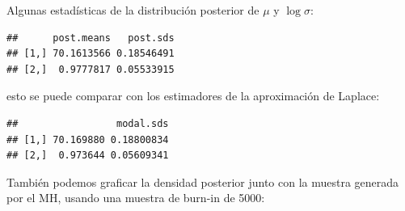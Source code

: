 \documentclass[
  12pt,
]{book}
\newenvironment{Shaded}{\begin{snugshade}}{\end{snugshade}}
\newcommand{\AttributeTok}[1]{\textcolor[rgb]{0.77,0.63,0.00}{#1}}
\newcommand{\DecValTok}[1]{\textcolor[rgb]{0.00,0.00,0.81}{#1}}
\newcommand{\FloatTok}[1]{\textcolor[rgb]{0.00,0.00,0.81}{#1}}
\newcommand{\FunctionTok}[1]{\textcolor[rgb]{0.00,0.00,0.00}{#1}}
\newcommand{\NormalTok}[1]{#1}
\newcommand{\OtherTok}[1]{\textcolor[rgb]{0.56,0.35,0.01}{#1}}
\newcommand{\SpecialCharTok}[1]{\textcolor[rgb]{0.00,0.00,0.00}{#1}}
\newcommand{\StringTok}[1]{\textcolor[rgb]{0.31,0.60,0.02}{#1}}
\theoremstyle{definition}
\theoremstyle{definition}
\theoremstyle{definition}
\theoremstyle{definition}
\theoremstyle{remark}
\begin{document}
Algunas estadísticas de la distribución posterior de \(\mu\) y \(\log \sigma\):

\begin{Shaded}
\end{Shaded}

\begin{verbatim}
##      post.means   post.sds
## [1,] 70.1613566 0.18546491
## [2,]  0.9777817 0.05533915
\end{verbatim}

esto se puede comparar con los estimadores de la aproximación de Laplace:

\begin{Shaded}
\end{Shaded}

\begin{verbatim}
##                 modal.sds
## [1,] 70.169880 0.18800834
## [2,]  0.973644 0.05609341
\end{verbatim}

También podemos graficar la densidad posterior junto con la muestra generada por el MH, usando una muestra de burn-in de 5000:

\begin{Shaded}
\end{Shaded}
\end{document}
